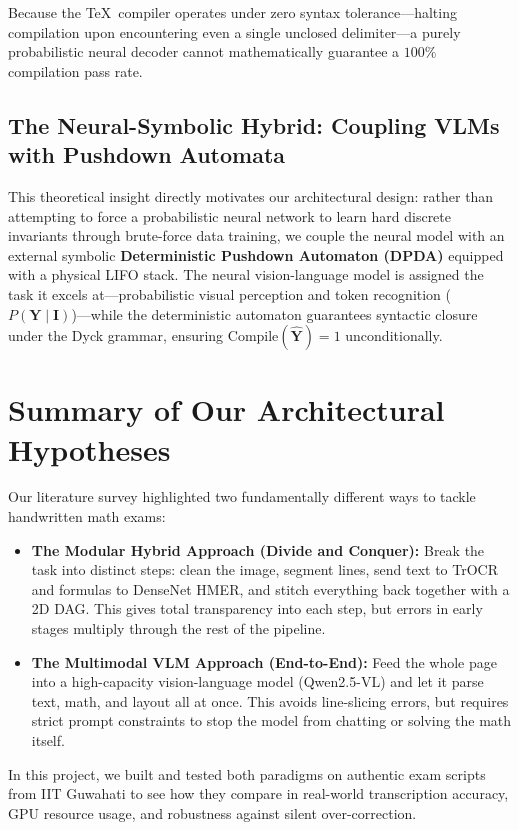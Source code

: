 Because the \TeX\ compiler operates under zero syntax tolerance---halting compilation upon encountering even a single unclosed delimiter---a purely probabilistic neural decoder cannot mathematically guarantee a $100\%$ compilation pass rate.

\subsection{The Neural-Symbolic Hybrid: Coupling VLMs with Pushdown Automata}
This theoretical insight directly motivates our architectural design: rather than attempting to force a probabilistic neural network to learn hard discrete invariants through brute-force data training, we couple the neural model with an external symbolic \textbf{Deterministic Pushdown Automaton (DPDA)} equipped with a physical LIFO stack. The neural vision-language model is assigned the task it excels at---probabilistic visual perception and token recognition ($P(\mathbf{Y} \mid \mathbf{I})$)---while the deterministic automaton guarantees syntactic closure under the Dyck grammar, ensuring $\text{Compile}(\hat{\mathbf{Y}}) = 1$ unconditionally.

\section{Summary of Our Architectural Hypotheses}
\label{sec:architectural_synthesis}

Our literature survey highlighted two fundamentally different ways to tackle handwritten math exams:
\begin{itemize}
    \item \textbf{The Modular Hybrid Approach (Divide and Conquer):} Break the task into distinct steps: clean the image, segment lines, send text to TrOCR and formulas to DenseNet HMER, and stitch everything back together with a 2D DAG. This gives total transparency into each step, but errors in early stages multiply through the rest of the pipeline.
    \item \textbf{The Multimodal VLM Approach (End-to-End):} Feed the whole page into a high-capacity vision-language model (Qwen2.5-VL) and let it parse text, math, and layout all at once. This avoids line-slicing errors, but requires strict prompt constraints to stop the model from chatting or solving the math itself.
\end{itemize}

In this project, we built and tested both paradigms on authentic exam scripts from IIT Guwahati to see how they compare in real-world transcription accuracy, GPU resource usage, and robustness against silent over-correction.
